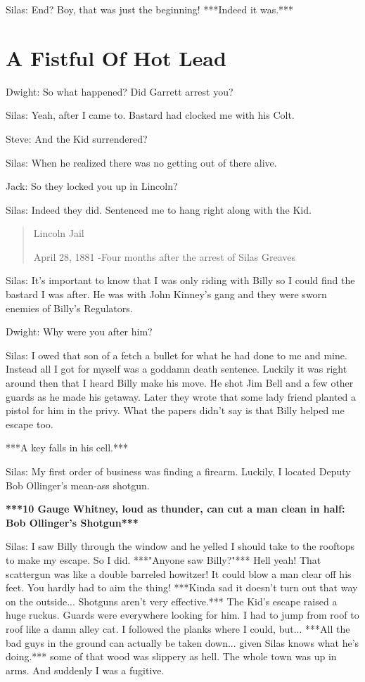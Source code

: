 \documentclass{article}
\begin{document}
Silas: End? Boy, that was just the beginning! ***Indeed it was.***

\section*{A Fistful Of Hot Lead}

Dwight: So what happened? Did Garrett arrest you?

Silas: Yeah, after I came to. Bastard had clocked me with his Colt.

Steve: And the Kid surrendered?

Silas: When he realized there was no getting out of there alive.

Jack: So they locked you up in Lincoln?

Silas: Indeed they did. Sentenced me to hang right along with the Kid.

\begin{quote}
    Lincoln Jail

    April 28, 1881 -Four months after the arrest of Silas Greaves
\end{quote}

Silas: It's important to know that I was only riding with Billy so I could find the bastard I was after. He was with John Kinney's gang and they were sworn enemies of Billy's Regulators.

Dwight: Why were you after him?

Silas: I owed that son of a fetch a bullet for what he had done to me and mine. Instead all I got for myself was a goddamn death sentence. Luckily it was right around then that I heard Billy make his move. He shot Jim Bell and a few other guards as he made his getaway. Later they wrote that some lady friend planted a pistol for him in the privy. What the papers didn't say is that Billy helped me escape too.

***A key falls in his cell.***

Silas: My first order of business was finding a firearm. Luckily, I located Deputy Bob Ollinger's mean-ass shotgun.

\textbf{***10 Gauge Whitney, loud as thunder, can cut a man clean in half: Bob Ollinger's Shotgun***}

Silas: I saw Billy through the window and he yelled I should take to the rooftops to make my escape. So I did. ***"Anyone saw Billy?"*** Hell yeah! That scattergun was like a double barreled howitzer! It could blow a man clear off his feet. You hardly had to aim the thing! ***Kinda sad it doesn't turn out that way on the outside... Shotguns aren't very effective.*** The Kid's escape raised a huge ruckus. Guards were everywhere looking for him. I had to jump from roof to roof like a damn alley cat. I followed the planks where I could, but... ***All the bad guys in the ground can actually be taken down... given Silas knows what he's doing.*** some of that wood was slippery as hell. The whole town was up in arms. And suddenly I was a fugitive.
\end{document}
